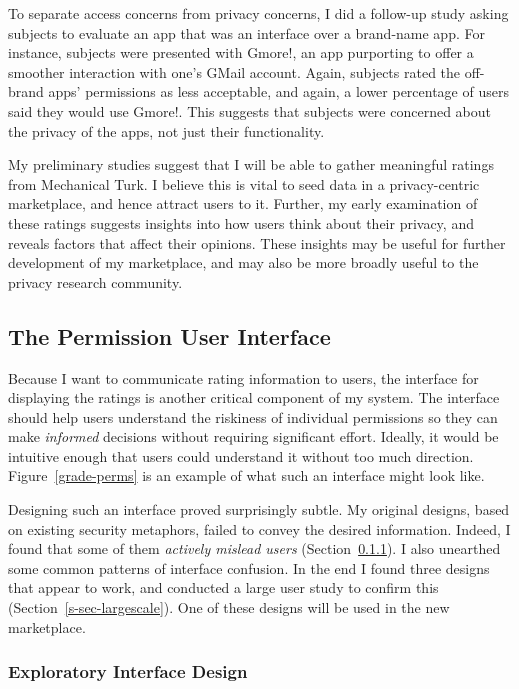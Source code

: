 \documentclass[11pt]{article}
\newcommand{\reffig}[1]{Figure~\ref{#1}}
\newcommand{\refsec}[1]{Section~\ref{#1}}
\begin{document}
To separate access concerns from privacy concerns, I did a follow-up
study asking subjects to evaluate an app that was an
interface over a brand-name app. For instance,
subjects were presented with Gmore!, an app purporting to offer a
smoother interaction with one's GMail account. Again, subjects rated
the off-brand apps' permissions as less acceptable, and again, a lower
percentage of users said they would use Gmore!. This suggests that
subjects were concerned about the privacy of the apps, not just their
functionality.

My preliminary studies suggest that I will be able to gather
meaningful ratings from Mechanical Turk. I believe this is vital
to seed data in a privacy-centric marketplace, and hence attract users
to it. Further, my early examination of these ratings 
suggests insights into how users think about their privacy, and reveals
factors that affect their opinions. These insights may be useful for
further development of my marketplace, and may also be more broadly
useful to the privacy research community.

\subsection{The Permission User Interface}
\label{subsec-perm-ui}

Because I want to communicate rating information to users,
the interface for displaying the ratings is another critical component of 
my system. The interface should help users understand the 
riskiness of individual permissions so they can make \emph{informed}
decisions without requiring significant
effort. Ideally, it would be 
intuitive enough that users could understand it without too 
much direction. \reffig{grade-perms} is an example of what such an interface
might look like.

Designing such an interface proved surprisingly subtle. 
My original designs, based on existing security 
metaphors, failed to convey the desired information.
Indeed, I found that some of them \emph{actively 
mislead users} (\refsec{sec-ui-design}).
I also unearthed some common patterns of interface
confusion. In the end I found three designs that appear to work, and
conducted a large user study to confirm this
(\refsec{s-sec-largescale}). One of these designs will be used in the new
marketplace.

\subsubsection{Exploratory Interface Design}
\label{sec-ui-design}
\end{document}
